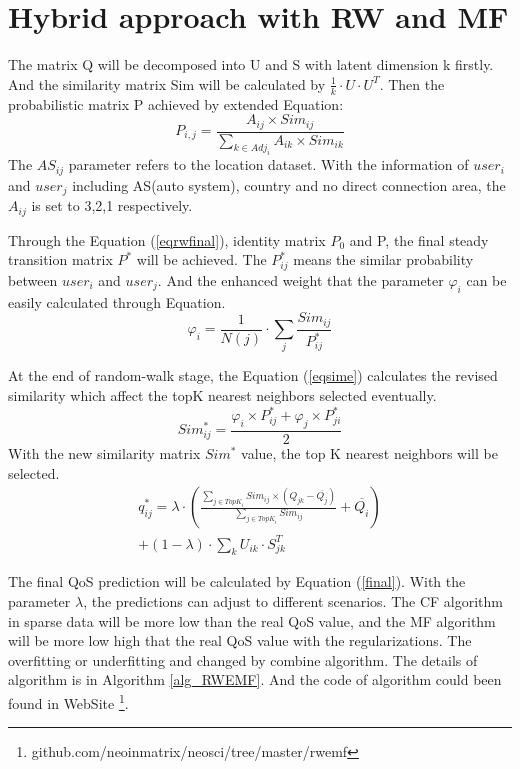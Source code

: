 \documentclass[conference]{IEEEtran}
\begin{document}
\section{Hybrid approach with RW and MF}\label{S-HRWMF}
\par The matrix Q will be decomposed into U and S with  latent dimension k firstly. And the similarity matrix Sim will be calculated by $\frac{1}{k} \cdot U \cdot U^{T}$. Then the probabilistic matrix P achieved by extended Equation:
\begin{equation}
P_{i,j}=\frac{A_{ij} \times Sim_{ij}}{\sum_{k \in Adj_{i}}{A_{ik} \times Sim_{ik}}}
\end{equation}
The $AS_{ij}$ parameter refers to the location dataset. With the information of $user_{i}$ and $user_{j}$ including AS(auto system), country and no direct connection area, the $A_{ij}$ is set to 3,2,1 respectively. 
\par Through the Equation (\ref{eqrwfinal}), identity matrix $P_{0}$ and P, the final steady transition matrix $P^{*}$ will be achieved. The $P^{*}_{ij}$ means the similar probability between $user_{i}$ and $user_{j}$. And the enhanced weight that the parameter $\varphi_{i}$ can be easily calculated through Equation.
\begin{equation}
\varphi_{i}=\frac{1}{N(j)} \cdot \sum_{j}{\frac{Sim_{ij}}{P^{*}_{ij}}}
\end{equation}
\par At the end of random-walk stage, the Equation (\ref{eqsime}) calculates the revised similarity which affect the topK nearest neighbors selected eventually.
\begin{equation}\label{eqsime} 
Sim_{ij}^{*}=\frac
{
\varphi_{i} \times P^{*}_{ij} + \varphi_{j} \times P^{*}_{ji}
}{2}
\end{equation}
With the new similarity matrix $Sim^{*}$ value, the top K nearest neighbors will be selected. 
\begin{equation}
\begin{aligned}
q_{ij}^{*}= \lambda \cdot (
\frac{
  \sum_{j \in TopK_{i}}{Sim_{ij} \times (Q_{jk}-\overline{Q_{j}})}
}{\sum_{j \in TopK_{i}}{Sim_{ij}}
}+\overline{Q_{i}}
) \\ + (1-\lambda) \cdot \sum_{k}U_{ik} \cdot S_{jk}^{T}
\label{final}
\end{aligned}
\end{equation}
\par The final QoS prediction will be calculated by Equation (\ref{final}). With the parameter $\lambda$, the predictions can adjust to different scenarios. The CF algorithm in sparse data will be more low than the real QoS value, and the MF algorithm will be more low high that the real QoS value with the regularizations. The overfitting or underfitting and changed by combine algorithm. The details of algorithm is in Algorithm \ref{alg_RWEMF}. And the code of algorithm could been found in WebSite \footnote{github.com/neoinmatrix/neosci/tree/master/rwemf}.

\end{document}
